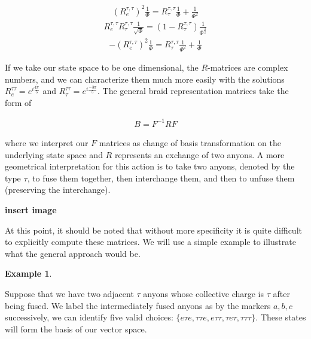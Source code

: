 \documentclass[10pt]{ucthesis}
\newtheorem{example}[definition]{Example}
\begin{document}
\begin{equation}
	\begin{aligned}
		(R^{\tau,\tau}_e)^2\frac{1}{\Phi} = R^{\tau,\tau}_\tau\frac{1}{\Phi} + \frac{1}{\Phi^2}
	\end{aligned}
\end{equation}
\begin{equation}
	\begin{aligned}
		R^{\tau,\tau}_eR^{\tau,\tau}_\tau\frac{1}{\sqrt{\Phi}} = (1-R^{\tau,\tau}_\tau)\frac{1}{\Phi^\frac{3}{2}} 
	\end{aligned}
\end{equation}
\begin{equation}
	\begin{aligned}
		-(R^{\tau,\tau}_e)^2\frac{1}{\Phi} = R^{\tau,\tau}_\tau\frac{1}{\Phi^2}+\frac{1}{\Phi}
	\end{aligned}
\end{equation}

If we take our state space to be one dimensional, the $R$-matrices are complex numbers, and we can characterize them much more easily with the solutions $R^{\tau\tau}_e = e^{i\frac{4\pi}{5}}$ and $R^{\tau\tau}_\tau = e^{i\frac{-3\pi}{5}}$. The general braid representation matrices take the form of 

\begin{equation}
	\begin{aligned}
		B = F^{-1}R F
	\end{aligned}
\end{equation}

where we interpret our $F$ matrices as change of basis transformation on the underlying state space and $R$ represents an exchange of two anyons. A more geometrical interpretation for this action is to take two anyons, denoted by the type $\tau$, to fuse them together, then interchange them, and then to unfuse them (preserving the interchange). 

\textbf{insert image}

At this point, it should be noted that without more specificity it is quite difficult to explicitly compute these matrices. We will use a simple example to illustrate what the general approach would be.

\begin{example}
\end{example}
Suppose that we have two adjacent $\tau$ anyons whose collective charge is $\tau$ after being fused. We label the intermediately fused anyons as by the markers $a,b,c$ successively, we can identify five valid choices: $\{e\tau e,\tau\tau e, e\tau\tau, \tau e\tau, \tau\tau\tau\}$. These states will form the basis of our vector space.
\end{document}
